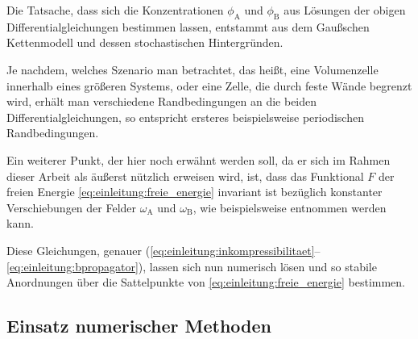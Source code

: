 Die Tatsache, dass sich die Konzentrationen $\phi_{\mathrm{A}}$ und $\phi_{\mathrm{B}}$ aus Lösungen der obigen Differentialgleichungen bestimmen lassen, entstammt aus dem Gaußschen Kettenmodell und dessen stochastischen Hintergründen.

Je nachdem, welches Szenario man betrachtet, das heißt, eine Volumenzelle innerhalb eines größeren Systems, oder eine Zelle, die durch feste Wände begrenzt wird, erhält man verschiedene Randbedingungen an die beiden Differentialgleichungen, so entspricht ersteres beispielsweise periodischen Randbedingungen.

Ein weiterer Punkt, der hier noch erwähnt werden soll, da er sich im Rahmen dieser Arbeit als äußerst nützlich erweisen wird, ist, dass das Funktional $F$ der freien Energie \eqref{eq:einleitung:freie_energie} invariant ist bezüglich konstanter Verschiebungen der Felder $\omega_{\mathrm{A}}$ und $\omega_{\mathrm{B}}$, wie beispielsweise \cite{Ceniceros:2006is} entnommen werden kann.

Diese Gleichungen, genauer (\ref{eq:einleitung:inkompressibilitaet}--\ref{eq:einleitung:bpropagator}), lassen sich nun numerisch lösen und so stabile Anordnungen über die Sattelpunkte von \eqref{eq:einleitung:freie_energie} bestimmen.


\subsection*{Einsatz numerischer Methoden} %

